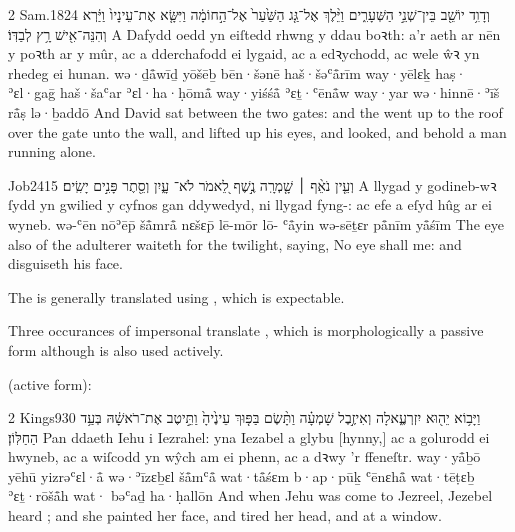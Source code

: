 \begin{example}{2 Sam.}{18}{24}{}{}
	\quoling
	{וְדָוִ֥ד יוֹשֵׁ֖ב בֵּין־שְׁנֵ֣י הַשְּׁעָרִ֑ים וַיֵּ֨לֶךְ  אֶל־גַּ֤ג הַשַּׁ֙עַר֙ אֶל־הַ֣חוֹמָ֔ה וַיִּשָּׂ֤א אֶת־עֵינָיו֙ וַיַּ֔רְא וְהִנֵּה־אִ֖ישׁ רָ֥ץ לְבַדּֽוֹ׃}
	{A Dafydd oedd yn eiſtedd rhwng y ddau boꝛth: a’r  aeth ar nēn y poꝛth ar y mûr, ac a dderchafodd ei lygaid, ac a edꝛychodd, ac wele ŵꝛ yn rhedeg ei hunan.}
	{wə·ḏå̄wīḏ yōšēḇ bēn·šənē haš·šəʿå̄rīm way·yēlɛḵ haṣ· ʾɛl·gaḡ haš·šaʿar ʾɛl·ha·ḥōmå̄ way·yiśśå̄ ʾɛṯ·ʿēnå̄w way·yar wə·hinnē·ʾīš rå̄ṣ lə·ḇaddō}
	{And David sat between the two gates: and the  went up to the roof over the gate unto the wall, and lifted up his eyes, and looked, and behold a man running alone.}
\end{example}



\begin{example}{Job}{24}{15}{}{}
	\quoling
	{וְעֵ֤ין נֹאֵ֨ף ׀ שָׁ֤מְרָֽה נֶ֣שֶׁף לֵ֭אמֹר לֹא־ עָ֑יִן וְסֵ֖תֶר פָּנִ֣ים יָשִֽׂים׃}
	{A llygad y godineb-wꝛ ſydd yn gwilied y cyfnos gan ddywedyd, ni  llygad fyng-: ac efe a eſyd hûg ar ei wyneb.}
	{wə-ʿēn nōʾēp̄ šå̄mrå̄ nɛšɛp̄ lē-mōr lō- ʿå̄yin wə-sēṯɛr på̄nīm yå̄śīm}
	{The eye also of the adulterer waiteth for the twilight, saying, No eye shall  me: and disguiseth his face.}
\end{example}




\begin{paper}
	The  is generally translated using , which is expectable.

	\begin{leftbar}
		Three occurances of impersonal  translate , which is morphologically a passive form although is also used actively.
	\end{leftbar}
\end{paper}

 (active form):
\begin{example}{2 Kings}{9}{30}{}{}
	\quoling
	{וַיָּב֥וֹא יֵה֖וּא יִזְרְעֶ֑אלָה וְאִיזֶ֣בֶל שָׁמְעָ֗ה וַתָּ֨שֶׂם בַּפּ֤וּךְ עֵינֶ֙יהָ֙ וַתֵּ֣יטֶב אֶת־רֹאשָׁ֔הּ  בְּעַ֥ד הַחַלּֽוֹן׃}
	{Pan ddaeth Iehu i Iezrahel: yna Iezabel a glybu [hynny,] ac a golurodd ei hwyneb, ac a wiſcodd yn wŷch am ei phenn, ac a  dꝛwy ’r ffeneſtr.}
	{way·yå̄ḇō yēhū yizrəʿɛl·å̄ wə·ʾīzɛḇɛl šå̄mʿå̄ wat·tå̄śɛm b·ap·pūḵ ʿēnɛhå̄ wat·tēṭɛḇ ʾɛṯ·rōšå̄h wat· bəʿaḏ ha·ḥallōn}
	{And when Jehu was come to Jezreel, Jezebel heard ; and she painted her face, and tired her head, and  at a window.}
\end{example}

